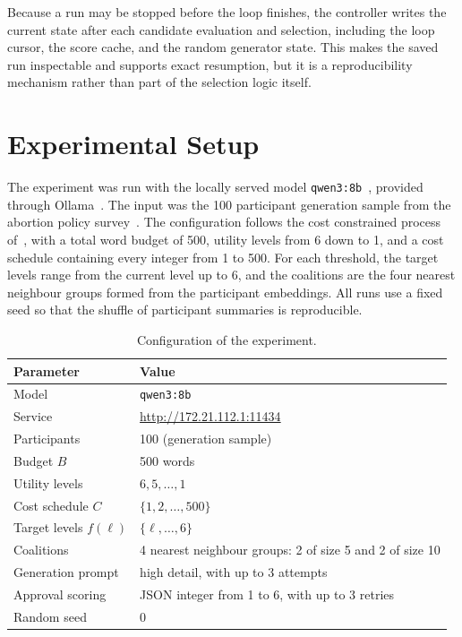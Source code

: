 \documentclass[letterpaper,11pt]{article}
\theoremstyle{plain}
\theoremstyle{definition}
\begin{document}
Because a run may be stopped before the loop finishes, the controller writes the current state after each candidate evaluation and selection, including the loop cursor, the score cache, and the random generator state. This makes the saved run inspectable and supports exact resumption, but it is a reproducibility mechanism rather than part of the selection logic itself.

\section{Experimental Setup}

The experiment was run with the locally served model \texttt{qwen3:8b}~\citep{yang2025qwen3}, provided through Ollama~\citep{ollama2026}. The input was the 100 participant generation sample from the abortion policy survey~\citep{fish2026gsc,gsc_survey_data}. The configuration follows the cost constrained process of~\citet{boehmer2025nextgen}, with a total word budget of 500, utility levels from 6 down to 1, and a cost schedule containing every integer from 1 to 500. For each threshold, the target levels range from the current level up to 6, and the coalitions are the four nearest neighbour groups formed from the participant embeddings. All runs use a fixed seed so that the shuffle of participant summaries is reproducible.

\begin{table}[htb]
\centering
\caption{Configuration of the experiment.}
\label{tab:setup}
\begin{tabular}{ll}
\toprule
Parameter & Value \\
\midrule
Model & \texttt{qwen3:8b} \\
Service & \url{http://172.21.112.1:11434} \\
Participants & 100 (generation sample) \\
Budget $B$ & 500 words \\
Utility levels & $6,5,\dots,1$ \\
Cost schedule $C$ & $\{1,2,\dots,500\}$ \\
Target levels $f(\ell)$ & $\{\ell,\dots,6\}$ \\
Coalitions & 4 nearest neighbour groups: 2 of size 5 and 2 of size 10 \\
Generation prompt & high detail, with up to 3 attempts \\
Approval scoring & JSON integer from 1 to 6, with up to 3 retries \\
Random seed & 0 \\
\bottomrule
\end{tabular}
\end{table}
\end{document}
